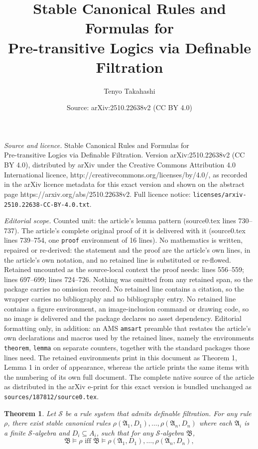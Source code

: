 \documentclass[10pt,a4paper]{amsart}
\title{Stable Canonical Rules and Formulas for \\ Pre-transitive Logics via Definable Filtration}
\author{Tenyo Takahashi}
\date{Source: arXiv:2510.22638v2 (CC BY 4.0)}
\newtheorem{theorem}{Theorem}
\newcommand{\A}{\alg{A}}
\newcommand{\B}{\alg{B}}
\renewcommand{\S}{\class{S}}
\newcommand{\alg}[1]{\mathfrak{#1}}
\newcommand{\class}[1]{\mathcal{#1}}
\begin{document}
\maketitle

\noindent\emph{Source and licence.} Stable Canonical Rules and Formulas for \\ Pre-transitive Logics via Definable Filtration. Version arXiv:2510.22638v2 (CC BY 4.0), distributed by arXiv under the Creative Commons Attribution 4.0 International licence, http://creativecommons.org/licenses/by/4.0/, as recorded in the arXiv licence metadata for this exact version and shown on the abstract page https://arxiv.org/abs/2510.22638v2. Full licence notice: \texttt{licenses/arxiv-2510.22638-CC-BY-4.0.txt}.\par\smallskip

\noindent\textit{Editorial scope.} Counted unit: the article's lemma pattern (source0.tex lines 730--737). The article's complete original proof of it is delivered with it (source0.tex lines 739--754, one \texttt{proof} environment of 16 lines). No mathematics is written, repaired or re-derived: the statement and the proof are the article's own lines, in the article's own notation, and no retained line is substituted or re-flowed.  Retained uncounted as the source-local context the proof needs: lines 556--559; lines 697--699; lines 724--726.  Nothing was omitted from any retained span, so the package carries no omission record.  No retained line contains a citation, so the wrapper carries no bibliography and no bibliography entry.  No retained line contains a figure environment, an image-inclusion command or drawing code, so no image is delivered and the package declares no asset dependency.  Editorial formatting only, in addition: an AMS \texttt{amsart} preamble that restates the article's own declarations and macros used by the retained lines, namely the environments \texttt{theorem}, \texttt{lemma} on separate counters, together with the standard packages those lines need.  The retained environments print in this document as Theorem 1, Lemma 1 in order of appearance, whereas the article prints the same items with the numbering of its own full document.  The complete native source of the article as distributed in the arXiv e-print for this exact version is bundled unchanged as \texttt{sources/187812/source0.tex}.
\begin{theorem} \label{3: Thm scr complete} 
    Let $\S$ be a rule system that admits definable filtration. For any rule $\rho$, there exist stable canonical rules $\rho(\A_1, D_1), \dots, \rho(\A_n, D_n)$ where each $\A_i$ is a finite $\S$-algebra and $D_i \subseteq A_i$, such that for any $\S$-algebra $\B$,
    \[\B \models \rho \text{ iff } \B \models\rho(\A_1, D_1), \dots, \rho(\A_n, D_n),\]
\end{theorem}
\end{document}
